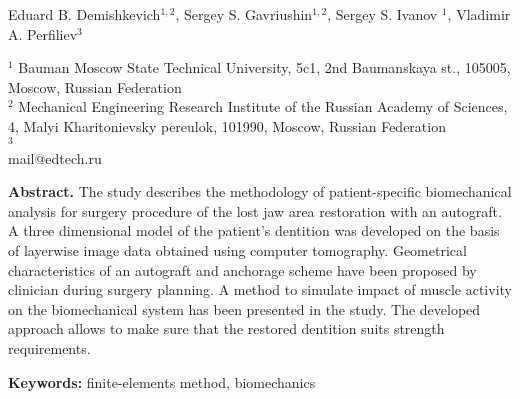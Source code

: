 \thispagestyle{empty}
{}

\vspace{5mm}

\begin{center} Eduard B. Demishkevich$^{1,2}$, Sergey S. Gavriushin$^{1,2}$, Sergey S. Ivanov $^{1}$, Vladimir A. Perfiliev$^{3}$  \\

\vspace{5mm}

{\small $^{1}$ Bauman Moscow State Technical University, 5c1, 2nd Baumanskaya st., 105005, Moscow, Russian Federation \\
$^{2}$ Mechanical Engineering Research Institute of the Russian Academy of Sciences, 4, Malyi Kharitonievsky pereulok, 101990, Moscow, Russian Federation \\
$^{3}$  \\
mail@edtech.ru 
}
\end{center}

\begin{changemargin}{0.5cm}{0.5cm}
{\small \textbf{Abstract.} 
The study describes the methodology of patient-specific biomechanical analysis for surgery procedure of the lost jaw area 
restoration with an autograft. A three dimensional model of the patient's dentition was developed on the basis of layerwise image data obtained
using computer tomography. Geometrical characteristics of an autograft and anchorage scheme have been proposed by clinician during surgery planning.
A method to simulate impact of muscle activity on the biomechanical system has been presented in the study. 
The developed approach allows to make sure that the restored dentition suits strength requirements.
}

{\small \textbf{Keywords:} finite-elements method, biomechanics}

\end{changemargin}
















